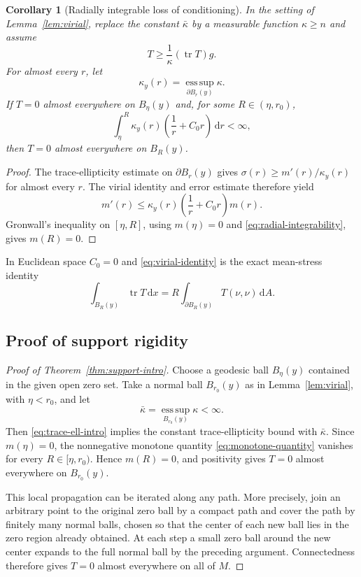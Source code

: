 \documentclass[11pt,reqno]{amsart}
\newtheorem{corollary}[theorem]{Corollary}
\theoremstyle{definition}
\theoremstyle{remark}
\newcommand{\tr}{\operatorname{tr}}
\newcommand{\dd}{\,\mathrm d}
\begin{document}
\begin{corollary}[Radially integrable loss of conditioning]\label{cor:radial-conditioning}
In the setting of Lemma~\ref{lem:virial}, replace the constant $\bar\kappa$ by a measurable function $\kappa\ge n$ and assume
\[
T\ge\frac1\kappa(\tr T)g.
\]
For almost every $r$, let
\[
\kappa_y(r)=\operatorname*{ess\,sup}_{\partial B_r(y)}\kappa.
\]
If $T=0$ almost everywhere on $B_\eta(y)$ and, for some $R\in(\eta,r_0)$,
\begin{equation}\label{eq:radial-integrability}
\int_\eta^R\kappa_y(r)\left(\frac1r+C_0r\right)\dd r<\infty,
\end{equation}
then $T=0$ almost everywhere on $B_R(y)$.
\end{corollary}

\begin{proof}
The trace-ellipticity estimate on $\partial B_r(y)$ gives $\sigma(r)\ge m'(r)/\kappa_y(r)$ for almost every $r$.  The virial identity and error estimate therefore yield
\[
m'(r)\le\kappa_y(r)\left(\frac1r+C_0r\right)m(r).
\]
Gronwall's inequality on $[\eta,R]$, using $m(\eta)=0$ and \eqref{eq:radial-integrability}, gives $m(R)=0$.
\end{proof}

In Euclidean space $C_0=0$ and \eqref{eq:virial-identity} is the exact mean-stress identity
\[
\int_{B_R(y)}\tr T\dd x
=R\int_{\partial B_R(y)}T(\nu,\nu)\dd A.
\]

\subsection{Proof of support rigidity}

\begin{proof}[Proof of Theorem~\ref{thm:support-intro}]
Choose a geodesic ball $B_\eta(y)$ contained in the given open zero set.  Take a normal ball $B_{r_0}(y)$ as in Lemma~\ref{lem:virial}, with $\eta<r_0$, and let
\[
\bar\kappa=\operatorname*{ess\,sup}_{B_{r_0}(y)}\kappa<\infty.
\]
Then \eqref{eq:trace-ell-intro} implies the constant trace-ellipticity bound with $\bar\kappa$.  Since $m(\eta)=0$, the nonnegative monotone quantity \eqref{eq:monotone-quantity} vanishes for every $R\in[\eta,r_0)$.  Hence $m(R)=0$, and positivity gives $T=0$ almost everywhere on $B_{r_0}(y)$.

This local propagation can be iterated along any path.  More precisely, join an arbitrary point to the original zero ball by a compact path and cover the path by finitely many normal balls, chosen so that the center of each new ball lies in the zero region already obtained.  At each step a small zero ball around the new center expands to the full normal ball by the preceding argument.  Connectedness therefore gives $T=0$ almost everywhere on all of $M$.
\end{proof}
\end{document}
